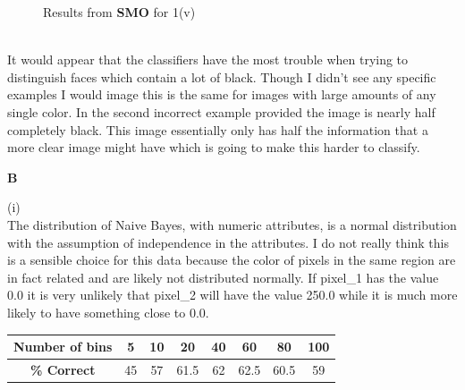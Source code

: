\documentclass{report}
\begin{document}
\begin{figure}[h]
  \centering
  \caption{Results from {\bf SMO} for 1(v)}
  \label{fig}
\end{figure}\\
It would appear that the classifiers have the most trouble when trying
to distinguish faces which contain a lot of black. Though I didn't see
any specific examples I would image this is the same for images with
large amounts of any single color. In the second incorrect example
provided the image is nearly half completely black. This image essentially
only has half the information that a more clear image might have which
is going to make this harder to classify.\\
\begin{center}{\bf \LARGE{B}}\end{center}
(i)\\
The distribution of Naive Bayes, with numeric attributes, is a normal
distribution with the
assumption of independence in the attributes. I do
not really think this is a sensible choice for this data because the
color of pixels in the same region are in fact related and are likely
not distributed normally. If pixel\_1
has the value 0.0 it is very unlikely that pixel\_2 will have the
value 250.0 while it is much more likely to have something close to
0.0.\\
\begin{center}
  \begin{tabular}{|c|c|c|c|c|c|c|c|}
    \hline
    {\bf Number of bins} & {\bf 5} & {\bf 10} &{\bf 20} & {\bf 40} & {\bf 60} & {\bf 80} & {\bf 100}\\
    \hline
    {\bf \% Correct} & 45 & 57 & 61.5 & 62 & 62.5 & 60.5 & 59\\
    \hline
  \end{tabular}
\end{center}
\end{document}
